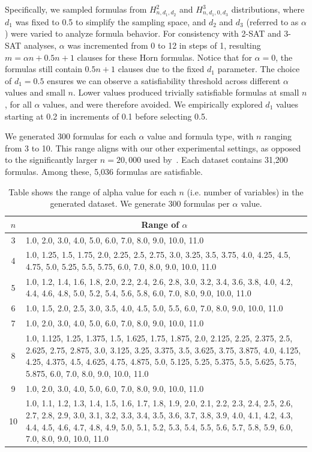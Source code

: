 \documentclass{article} %
\begin{document}
Specifically, we sampled formulas from $H^2_{n, d_1, d_2}$ and $H^3_{n, d_1, 0, d_3}$ distributions, where $d_1$ was fixed to 0.5 to simplify the sampling space, and $d_2$ and $d_3$ (referred to as $\alpha$) were varied to analyze formula behavior. For consistency with 2-SAT and 3-SAT analyses, $\alpha$ was incremented from 0 to 12 in steps of 1, resulting $m = \alpha n + 0.5n + 1$ clauses for these Horn formulas. Notice that for $\alpha=0$, the formulas still contain $0.5n + 1$ clauses due to the fixed $d_1$ parameter.
The choice of $d_1=0.5$ ensures we can observe a satisfiability threshold across different $\alpha$ values and small $n$. Lower values produced trivially satisfiable formulas at small $n$, for all $\alpha$ values, and were therefore avoided. We empirically explored $d_1$ values starting at 0.2 in increments of 0.1 before selecting 0.5. 

We generated 300 formulas for each $\alpha$ value and formula type, with $n$ ranging from 3 to 10. This range aligns with our other experimental settings, as opposed to the significantly larger $n=20,000$ used by~\citet{moore2007continuous}.
Each dataset contains 31,200 formulas. Among these, 5,036 formulas are satisfiable.



\begin{table}[t]
\centering
\caption{Table shows the range of alpha value for each $n$ (i.e. number of variables) in the generated dataset. We generate $300$ formulas per $\alpha$ value.}
\label{table: alpha_per_n}
\begin{tabular}{c|p{12cm}}
\hline
\(n\) & \multicolumn{1}{c}{Range of $\alpha$} \\ \hline
3 & 1.0, 2.0, 3.0, 4.0, 5.0, 6.0, 7.0, 8.0, 9.0, 10.0, 11.0 \\
4 & 1.0, 1.25, 1.5, 1.75, 2.0, 2.25, 2.5, 2.75, 3.0, 3.25, 3.5, 3.75, 4.0, 4.25, 4.5, 4.75, 5.0, 5.25, 5.5, 5.75, 6.0, 7.0, 8.0, 9.0, 10.0, 11.0 \\
5 & 1.0, 1.2, 1.4, 1.6, 1.8, 2.0, 2.2, 2.4, 2.6, 2.8, 3.0, 3.2, 3.4, 3.6, 3.8, 4.0, 4.2, 4.4, 4.6, 4.8, 5.0, 5.2, 5.4, 5.6, 5.8, 6.0, 7.0, 8.0, 9.0, 10.0, 11.0 \\
6 & 1.0, 1.5, 2.0, 2.5, 3.0, 3.5, 4.0, 4.5, 5.0, 5.5, 6.0, 7.0, 8.0, 9.0, 10.0, 11.0 \\
7 & 1.0, 2.0, 3.0, 4.0, 5.0, 6.0, 7.0, 8.0, 9.0, 10.0, 11.0 \\
8 & 1.0, 1.125, 1.25, 1.375, 1.5, 1.625, 1.75, 1.875, 2.0, 2.125, 2.25, 2.375, 2.5, 2.625, 2.75, 2.875, 3.0, 3.125, 3.25, 3.375, 3.5, 3.625, 3.75, 3.875, 4.0, 4.125, 4.25, 4.375, 4.5, 4.625, 4.75, 4.875, 5.0, 5.125, 5.25, 5.375, 5.5, 5.625, 5.75, 5.875, 6.0, 7.0, 8.0, 9.0, 10.0, 11.0 \\
9 & 1.0, 2.0, 3.0, 4.0, 5.0, 6.0, 7.0, 8.0, 9.0, 10.0, 11.0 \\
10 & 1.0, 1.1, 1.2, 1.3, 1.4, 1.5, 1.6, 1.7, 1.8, 1.9, 2.0, 2.1, 2.2, 2.3, 2.4, 2.5, 2.6, 2.7, 2.8, 2.9, 3.0, 3.1, 3.2, 3.3, 3.4, 3.5, 3.6, 3.7, 3.8, 3.9, 4.0, 4.1, 4.2, 4.3, 4.4, 4.5, 4.6, 4.7, 4.8, 4.9, 5.0, 5.1, 5.2, 5.3, 5.4, 5.5, 5.6, 5.7, 5.8, 5.9, 6.0, 7.0, 8.0, 9.0, 10.0, 11.0 \\
\hline
\end{tabular}
\end{table}
\end{document}
